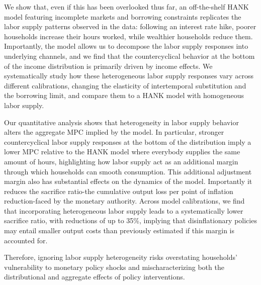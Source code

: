 \documentclass[a4paper,12pt]{article}%
\begin{document}
We show that, even if this has been overlooked thus far, an off-the-shelf HANK model featuring incomplete markets and borrowing constraints replicates the labor supply patterns observed in the data: following an interest rate hike, poorer households increase their hours worked, while wealthier households reduce them. Importantly, the model allows us to decompose the labor supply responses into underlying channels, and we find that the countercyclical behavior at the bottom of the income distribution is primarily driven by income effects. We systematically study how these heterogeneous labor supply responses vary across different calibrations, changing the elasticity of intertemporal substitution and the borrowing limit, and compare them to a HANK model with homogeneous labor supply.

Our quantitative analysis shows that heterogeneity in labor supply behavior alters the aggregate MPC implied by the model. In particular, stronger countercyclical labor supply responses at the bottom of the distribution imply a lower MPC relative to the HANK model where everybody supplies the same amount of hours, highlighting how labor supply act as an additional margin through which households can smooth consumption. This additional adjustment margin also has substantial effects on the dynamics of the model. Importantly it reduces the sacrifice ratio-the cumulative output loss per point of inflation reduction-faced by the monetary authority. Across model calibrations, we find that incorporating heterogeneous labor supply leads to a systematically lower sacrifice ratio, with reductions of up to 35\%, implying that disinflationary policies may entail smaller output costs than previously estimated if this margin is accounted for.

Therefore, ignoring labor supply heterogeneity risks overstating households' vulnerability to monetary policy shocks and mischaracterizing both the distributional and aggregate effects of policy interventions.


\end{document}
